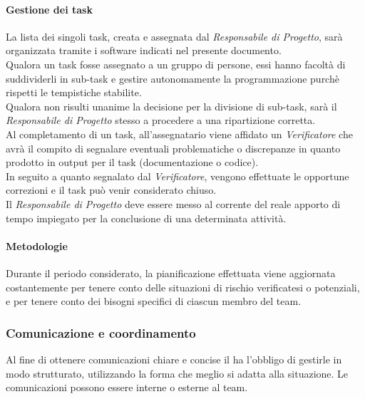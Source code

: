 		\paragraph{Gestione dei task}
		La lista dei singoli task, creata e assegnata dal \textit{Responsabile di Progetto}, sarà organizzata tramite i software indicati nel presente documento.\\
		Qualora un task fosse assegnato a un gruppo di persone, essi hanno facoltà di suddividerli in sub-task e gestire autonomamente la programmazione purchè rispetti le tempistiche stabilite.\\
		Qualora non risulti unanime la decisione per la divisione di sub-task, sarà il \textit{Responsabile di Progetto} stesso a procedere a una ripartizione corretta.\\
		Al completamento di un task, all'assegnatario viene affidato un \textit{Verificatore} che avrà il compito di segnalare eventuali problematiche o discrepanze in quanto prodotto in output per il task (documentazione o codice).\\
		In seguito a quanto segnalato dal \textit{Verificatore}, vengono effettuate le opportune correzioni e il task può venir considerato chiuso.\\
		Il \textit{Responsabile di Progetto} deve essere messo al corrente del reale apporto di tempo impiegato per la conclusione di una determinata attività.
		
		\paragraph{Metodologie}
		Durante il periodo considerato, la pianificazione effettuata viene aggiornata costantemente per tenere conto delle situazioni di rischio verificatesi o potenziali, e per tenere conto dei bisogni specifici di ciascun membro del team.
		
		\subsubsection{Comunicazione e coordinamento}
		Al fine di ottenere comunicazioni chiare e concise il \textit{\RdP} ha l'obbligo di gestirle in modo strutturato, utilizzando la forma che meglio si adatta alla situazione. Le comunicazioni possono essere interne o esterne al team.
			
